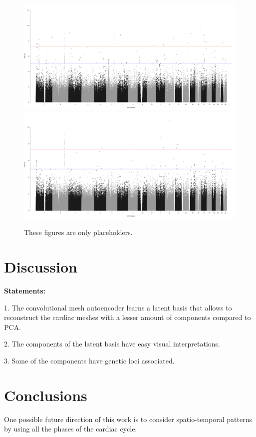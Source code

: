 \documentclass[twocolumn]{llncs}
\begin{document}
\begin{figure}
\includegraphics[width=0.8\linewidth]{figs/manhattan_LVEDV_automatic_adj.png}
\includegraphics[width=0.8\linewidth]{figs/manhattan_LVM_automatic_adj.png}
\caption{These figures are only placeholders.}
\end{figure}


\section{Discussion}

\textbf{Statements:
}

1. The convolutional mesh autoencoder learns a latent basis that allows to reconstruct the cardiac meshes with a lesser amount of components compared to PCA.

2. The components of the latent basis have easy visual interpretations.

3. Some of the components have genetic loci associated. 


\section{Conclusions}

One possible future direction of this work is to consider spatio-temporal patterns by using all the phases of the cardiac cycle.

\newpage

%
% 
% 
%
\end{document}
